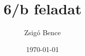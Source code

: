 \documentclass{article}
\begin{document}
\title{6/b feladat}
\author{Zsigó Bence}
\date{\today}
\maketitle
\end{document}
